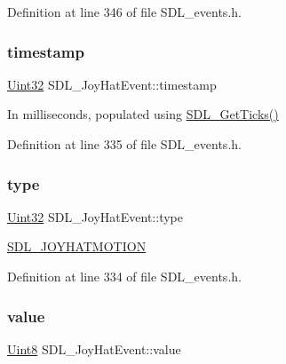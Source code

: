 Definition at line 346 of file S\+D\+L\+\_\+events.\+h.

\mbox{\label{struct_s_d_l___joy_hat_event_ade58ecb3e75aad4ef9809f040519a021}} 
\subsubsection{\texorpdfstring{timestamp}{timestamp}}
{\footnotesize\ttfamily \mbox{\hyperlink{_s_d_l__stdinc_8h_add440eff171ea5f55cb00c4a9ab8672d}{Uint32}} S\+D\+L\+\_\+\+Joy\+Hat\+Event\+::timestamp}

In milliseconds, populated using \mbox{\hyperlink{_s_d_l__timer_8h_a0b9bc71d6287e0ffafdc3419760fe2b3}{S\+D\+L\+\_\+\+Get\+Ticks()}} 

Definition at line 335 of file S\+D\+L\+\_\+events.\+h.

\mbox{\label{struct_s_d_l___joy_hat_event_ac583dafab46c44354e210a542aff57cc}} 
\subsubsection{\texorpdfstring{type}{type}}
{\footnotesize\ttfamily \mbox{\hyperlink{_s_d_l__stdinc_8h_add440eff171ea5f55cb00c4a9ab8672d}{Uint32}} S\+D\+L\+\_\+\+Joy\+Hat\+Event\+::type}

\mbox{\hyperlink{_s_d_l__events_8h_a3b589e89be6b35c02e0dd34a55f3fccaafba4080bfbad335e520097b2024f0dff}{S\+D\+L\+\_\+\+J\+O\+Y\+H\+A\+T\+M\+O\+T\+I\+ON}} 

Definition at line 334 of file S\+D\+L\+\_\+events.\+h.

\mbox{\label{struct_s_d_l___joy_hat_event_a52b179a34407449941b61d988ca72ef4}} 
\subsubsection{\texorpdfstring{value}{value}}
{\footnotesize\ttfamily \mbox{\hyperlink{_s_d_l__stdinc_8h_a2944638813a090aa23e62f4da842c3e2}{Uint8}} S\+D\+L\+\_\+\+Joy\+Hat\+Event\+::value}


